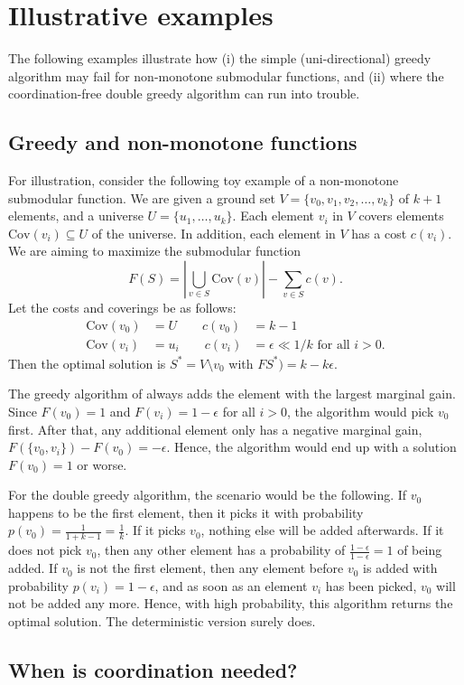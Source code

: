 \section{Illustrative examples}

The following examples illustrate how (i) the simple (uni-directional) greedy algorithm may fail for non-monotone submodular functions, and (ii) where the coordination-free double greedy algorithm can run into trouble.

\subsection{Greedy and non-monotone functions}\label{app:greedyfail}

For illustration, consider the following toy example of a non-monotone submodular function. We are given a ground set $V = \{v_0, v_1, v_2, \ldots, v_k\}$ of $k+1$ elements, and a universe $U = \{u_1, \ldots, u_k\}$. Each element $v_i$ in $V$ covers elements $\mathrm{Cov}(v_i) \subseteq U$ of the universe. In addition, each element in $V$ has a cost $c(v_i)$. We are aiming to maximize the submodular function
\begin{equation}
  \label{eq:1}
  F(S) = |\bigcup_{v \in S}\mathrm{Cov}(v)| - \sum_{v \in S}c(v).
\end{equation}
Let the costs and coverings be as follows:
\begin{align}
  \mathrm{Cov}(v_0) &= U \qquad c(v_0) &= k-1\\
  \mathrm{Cov}(v_i) &= u_i  \qquad c(v_i) &= \epsilon \ll 1/k \text{ for all } i > 0.
\end{align}
Then the optimal solution is $S^* = V\setminus v_0$ with $FS^*) = k - k\epsilon$. 

The greedy algorithm of \citet{nemhauser1978} always adds the element with the largest marginal gain. Since $F(v_0) = 1$ and $F(v_i) = 1-\epsilon$ for all $i > 0$, the algorithm would pick $v_0$ first. After that, any additional element only has a negative marginal gain, $F(\{v_0,v_i\}) - F(v_0) = - \epsilon$. Hence, the algorithm would end up with a solution $F(v_0) = 1$ or worse.

For the double greedy algorithm, the scenario would be the following.
If $v_0$ happens to be the first element, then it picks it with probability $p(v_0) = \frac{1}{1 + k-1} = \frac{1}{k}$. If it picks $v_0$, nothing else will be added afterwards. If it does not pick $v_0$, then any other element has a probability of $\frac{1-\epsilon}{1-\epsilon} = 1$ of being added.
If $v_0$ is not the first element, then any element before $v_0$ is added with probability $p(v_i) = 1-\epsilon$, and as soon as an element $v_i$ has been picked, $v_0$ will not be added any more. Hence, with high probability, this algorithm returns the optimal solution. The deterministic version surely does.


\subsection{When is coordination needed?}

